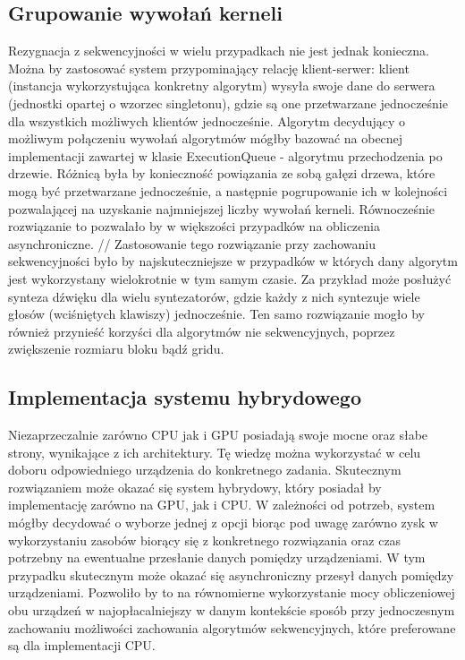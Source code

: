 \subsection{Grupowanie wywołań kerneli}
Rezygnacja z sekwencyjności w wielu przypadkach nie jest jednak konieczna. Można by zastosować system przypominający relację klient-serwer: klient (instancja wykorzystująca konkretny algorytm) wysyła swoje dane do serwera (jednostki opartej o wzorzec singletonu), gdzie są one przetwarzane jednocześnie dla wszystkich możliwych klientów jednocześnie. Algorytm decydujący o możliwym połączeniu wywołań algorytmów mógłby bazować na obecnej implementacji zawartej w klasie ExecutionQueue - algorytmu przechodzenia po drzewie. Różnicą była by konieczność powiązania ze sobą gałęzi drzewa, które mogą być przetwarzane jednocześnie, a następnie pogrupowanie ich w kolejności pozwalającej na uzyskanie najmniejszej liczby wywołań kerneli. Równocześnie rozwiązanie to pozwalało by w większości przypadków na obliczenia asynchroniczne.
//
Zastosowanie tego rozwiązanie przy zachowaniu sekwencyjności było by najskuteczniejsze w przypadków w których dany algorytm jest wykorzystany wielokrotnie w tym samym czasie. Za przykład może posłużyć synteza dźwięku dla wielu syntezatorów, gdzie każdy z nich syntezuje wiele głosów (wciśniętych klawiszy) jednocześnie. Ten samo rozwiązanie mogło by również przynieść korzyści dla algorytmów nie sekwencyjnych, poprzez zwiększenie rozmiaru bloku bądź gridu.

\subsection{Implementacja systemu hybrydowego}
Niezaprzeczalnie zarówno CPU jak i GPU posiadają swoje mocne oraz słabe strony, wynikające z ich architektury. Tę wiedzę można wykorzystać w celu doboru odpowiedniego urządzenia do konkretnego zadania. Skutecznym rozwiązaniem może okazać się system hybrydowy, który posiadał by implementację zarówno na GPU, jak i CPU. W zależności od potrzeb, system mógłby decydować o wyborze jednej z opcji biorąc pod uwagę zarówno zysk w wykorzystaniu zasobów biorący się z konkretnego rozwiązania oraz czas potrzebny na ewentualne przesłanie danych pomiędzy urządzeniami. W tym przypadku skutecznym może okazać się asynchroniczny przesył danych pomiędzy urządzeniami. Pozwoliło by to na równomierne wykorzystanie mocy obliczeniowej obu urządzeń w najopłacalniejszy w danym kontekście sposób przy jednoczesnym zachowaniu możliwości zachowania algorytmów sekwencyjnych, które preferowane są dla implementacji CPU.

